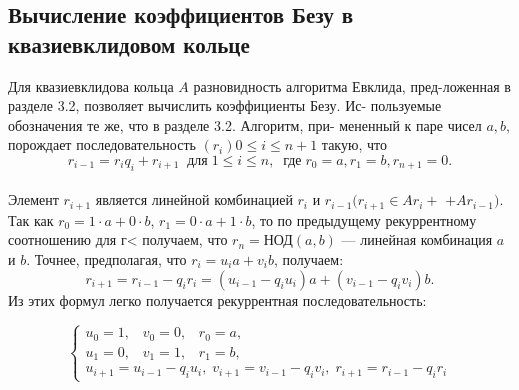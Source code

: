 \subsection{Вычисление коэффициентов Безу
в квазиевклидовом кольце}
\noindent Для квазиевклидова кольца $A$ разновидность алгоритма Евклида, пред-\linebreak­ложенная в разделе 3.2, позволяет вычислить коэффициенты Безу. Ис-\linebreak
­пользуемые обозначения те же, что в разделе 3.2. Алгоритм, при-\linebreak
ме­ненный к паре чисел $a,b$, порождает последовательность $(r_{i}){0\leqslant i\leqslant n+1}$\linebreak
такую, что\\
$$r_{i-1}=r_{i}q_{i}+r_{i+1}\;\;\text{для}\;1\leqslant i\leqslant n,\;\;\text{где}\;r_{0}=a,r_{1}=b,r_{n+1}=0.$$\\
Элемент $r_{i+1}$ является линейной комбинацией $r_{i}$ и $r_{i-1} (r_{i+1}\in Ar_{i}+$\linebreak
$+Ar_{i-1})$. Так как $r_{0}=1\cdot a+0\cdot b$, $r_{1}=0\cdot a+1\cdot b$, то по предыдущему\linebreak
рекуррентному соотношению для г< получаем, что $r_{n} = \text{НОД}(a,b)$ —\linebreak
линейная комбинация $a$ и $b$. Точнее, предполагая, что $r_{i}=u_{i}a+v_{i}b$,\linebreak
получаем:\\
$$r_{i+1}=r_{i-1}-q_{i}r_{i}=(u_{i-1}-q_{i}u_{i})a+(v_{i-1}-q_{i}v_{i})b.$$
\newpage
\noindent Из этих формул легко получается рекуррентная последовательность:

$$\left\lbrace\begin{array}{l}
u_{0}=1,\;\;\;v_{0}=0,\;\;\;r_{0}=a,\\
u_{1}=0,\;\;\;v_{1}=1,\;\;\;r_{1}=b,\\
u_{i+1}=u_{i-1}-q_{i}u_{i},\;v_{i+1}=v_{i-1}-q_{i}v_{i},\;r_{i+1}=r_{i-1}-q_{i}r_{i}
\end{array}\right.$$

